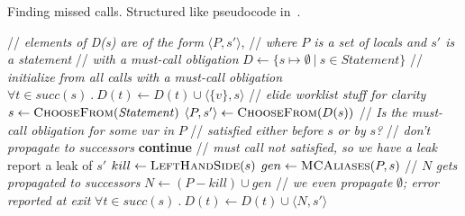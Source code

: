 

\begin{algorithm}[t]
  \caption{Finding missed calls.  Structured like pseudocode in~\cite{TorlakC10}.}
  \label{alg:find-copies}
  \begin{algorithmic}[1]
  \State // \textit{elements of D(s) are of the form} $\langle P, s' \rangle$,
  \State // \textit{where $P$ is a set of locals and $s'$ is a statement}
  \State // \textit{with a must-call obligation}
  \State $D \gets \{ s \mapsto \emptyset\ |\ s \in \mathit{Statement} \}$
  \State // \textit{initialize from all calls with a must-call obligation}
      \State $\forall t \in \mathit{succ}(s)\ .\ D(t) \leftarrow D(t) \cup \langle \{v\}, s \rangle$
    \EndFor
  \EndFor
  \State // \textit{elide worklist stuff for clarity}
    \State $s \gets \textsc{ChooseFrom}(\mathit{Statement})$
    \State $\langle P, s' \rangle \gets \textsc{ChooseFrom}(D(s))$
    \State // \textit{Is the must-call obligation for some var in } $P$
    \State // \textit{satisfied either before }$s$\textit{ or by } $s$\textit{?}
    \State // \textit{don't propagate to successors}
    \State \textbf{continue} 
    \EndIf
      \State // \textit{must call not satisfied, so we have a leak}
      \State report a leak of $s'$
    \Else
    \State $kill \gets \textsc{LeftHandSide}(s)$
    \State $gen \gets \textsc{MCAliases}(P,s)$
    \State // $N$ \textit{gets propagated to successors}
    \State $N \gets (P - kill) \cup gen$
    \State // \textit{we even propagate }$\emptyset$\textit{; error reported at exit}
    \State $\forall t \in \mathit{succ}(s)\ .\ D(t) \leftarrow D(t) \cup \langle N, s' \rangle$
    \EndIf
  \EndWhile \label{li:alg-loop-end}
  \EndProcedure
  \end{algorithmic}
\end{algorithm}

